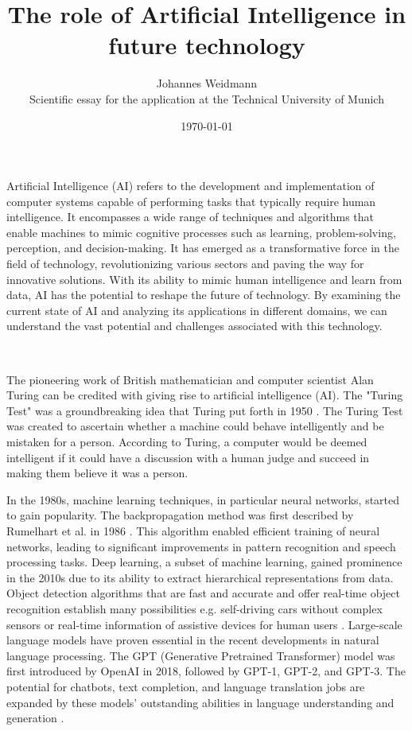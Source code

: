 \documentclass{article}
\title{\textbf{The role of Artificial Intelligence in future technology}}
\author{Johannes Weidmann  \\
	\small{Scientific essay for the application at the Technical University of Munich}
}
\date{\today}
\begin{document}
\maketitle

Artificial Intelligence (AI) refers to the development and implementation of computer systems capable of performing tasks that typically require human intelligence. It encompasses a wide range of techniques and algorithms that enable machines to mimic cognitive processes such as learning, problem-solving, perception, and decision-making. It has emerged as a transformative force in the field of technology, revolutionizing various sectors and paving the way for innovative solutions. With its ability to mimic human intelligence and learn from data, AI has the potential to reshape the future of technology. By examining the current state of AI and analyzing its applications in different domains, we can understand the vast potential and challenges associated with this technology. \par \ \par

The pioneering work of British mathematician and computer scientist Alan Turing can be credited with giving rise to artificial intelligence (AI). The "Turing Test" was a groundbreaking idea that Turing put forth in 1950 \cite{1}.
The Turing Test was created to ascertain whether a machine could behave intelligently and be mistaken for a person. According to Turing, a computer would be deemed intelligent if it could have a discussion with a human judge and succeed in making them believe it was a person. \par
In the 1980s, machine learning techniques, in particular neural networks, started to gain popularity. The backpropagation method was first described by Rumelhart et al. in 1986 \cite{2}. This algorithm enabled efficient training of neural networks, leading to significant improvements in pattern recognition and speech processing tasks.
Deep learning, a subset of machine learning, gained prominence in the 2010s due to its ability to extract hierarchical representations from data. Object detection algorithms that are fast and accurate and offer real-time object recognition establish many possibilities e.g. self-driving cars without complex sensors or real-time information of assistive devices for human users \cite{3}. 
Large-scale language models have proven essential in the recent developments in natural language processing. The GPT (Generative Pretrained Transformer) model was first introduced by OpenAI in 2018, followed by GPT-1, GPT-2, and GPT-3. The potential for chatbots, text completion, and language translation jobs are expanded by these models' outstanding abilities in language understanding and generation \cite{4}. \par \ \par
\end{document}
